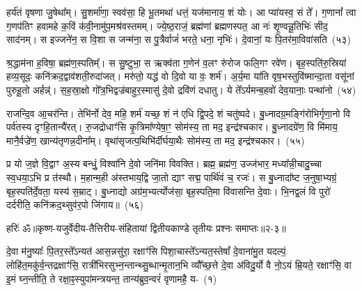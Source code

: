 हर्य॑तं वृषणा जु॒षेथा᳚म्। सु॒शर्मा॑णा॒ स्वव॑सा॒ हि भू॒तमथा॑ धत्तं॒ यज॑मानाय॒ शं योः। आ प्या॑यस्व॒ सं ते᳚। ग॒णानां᳚ त्वा ग॒णप॑तिꣳ हवामहे क॒विं क॑वी॒नामु॑प॒मश्र॑वस्तमम्। ज्ये॒ष्ठ॒राजं॒ ब्रह्म॑णां ब्रह्मणस्पत॒ आ नः॑ शृ॒ण्वन्नू॒तिभिः॑ सीद॒ साद॑नम्। स इज्जने॑न॒ स वि॒शा स जन्म॑ना॒ स पु॒त्रैर्वाजं॑ भरते॒ धना॒ नृभिः॑। दे॒वानां॒ यः पि॒तर॑मा॒विवा॑सति~(५३)

श्र॒द्धाम॑ना ह॒विषा॒ ब्रह्म॑ण॒स्पतिम्᳚। स सु॒ष्टुभा॒ स ऋक्व॑ता ग॒णेन॑ व॒लꣳ रु॑रोज फलि॒गꣳ रवे॑ण। बृह॒स्पति॑रु॒स्रिया॑ हव्य॒सूदः॒ कनि॑क्रद॒द्वाव॑शती॒रुदा॑जत्। मरु॑तो॒ यद्ध॑ वो दि॒वो या वः॒ शर्म॑। अ॒र्य॒मा या॑ति वृष॒भस्तुवि॑ष्मान्दा॒ता वसू॑नां पुरुहू॒तो अर्\mbox{}हन्न्॑। स॒ह॒स्रा॒क्षो गो᳚त्र॒भिद्वज्र॑बाहुर॒स्मासु॑ दे॒वो द्रवि॑णं दधातु। ये ते᳚\-ऽर्यमन्ब॒हवो॑ देव॒यानाः॒ पन्था॑नो~(५४)

राजन्दि॒व आ॒चर॑न्ति। तेभि॑र्नो देव॒ महि॒ शर्म॑ यच्छ॒ शं न॑ एधि द्वि॒पदे॒ शं चतु॑ष्पदे। बु॒ध्नादग्र॒मङ्गि॑रोभिर्गृणा॒नो वि पर्व॑तस्य दृꣳहि॒तान्यै॑रत्। रु॒जद्रोधाꣳ॑सि कृ॒त्रिमा᳚ण्येषा॒ꣳ॒ सोम॑स्य॒ ता मद॒ इन्द्र॑श्चकार। बु॒ध्नादग्रे॑ण॒ वि मि॑माय॒ मानै॒र्वज्रे॑ण॒ खान्य॑तृणन्न॒दीना᳚म्। वृथा॑सृजत्प॒थिभि॑र्दीर्घया॒थैः सोम॑स्य॒ ता मद॒ इन्द्र॑श्चकार।~(५५)

प्र यो ज॒ज्ञे वि॒द्वाꣳ अ॒स्य बन्धुं॒ विश्वा॑नि दे॒वो जनि॑मा विवक्ति। ब्रह्म॒ ब्रह्म॑ण॒ उज्ज॑भार॒ मध्या᳚न्नी॒चादु॒च्चा स्व॒धया॒\-ऽभि प्र त॑स्थौ। म॒हान्म॒ही अ॑स्तभाय॒द्वि जा॒तो द्याꣳ सद्म॒ पार्थि॑वं च॒ रजः॑। स बु॒ध्नादा᳚ष्ट ज॒नुषा॒भ्यग्रं॒ बृह॒स्पति॑र्दे॒वता॒ यस्य॑ स॒म्राट्। बु॒ध्नाद्यो अग्र॑म॒भ्यर्त्योज॑सा॒ बृह॒स्पति॒मा वि॑वासन्ति दे॒वाः। भि॒नद्व॒लं वि पुरो॑ दर्दरीति॒ कनि॑क्रद॒थ्सुव॑र॒पो जि॑गाय॥~(५६)

{\anuvakamend[{यु॒वं वी॒तमा॒ विवा॑सति॒ पन्था॑नो दीर्घया॒थैः सोम॑स्य॒ ता मद॒ इन्द्र॑श्चकार दे॒वा नव॑ च}]}%

{हरिः॑ ॐ}{॥कृष्ण-यजुर्वेदीय-तैत्तिरीय-संहितायां द्वितीयकाण्डे तृतीयः प्रश्नः समाप्तः॥२-३॥}

\setcounter{anuvakam}{0}
दे॒वा म॑नु॒ष्याः᳚ पि॒तर॒स्ते᳚\-ऽन्यत॑ आस॒न्नसु॑रा॒ रक्षाꣳ॑सि पिशा॒चास्ते᳚\-ऽन्यत॒स्तेषां᳚ दे॒वाना॑मु॒त यदल्पं॒ लोहि॑त॒मकु॑र्व॒न्तद्रक्षाꣳ॑सि॒ रात्री॑भिरसुभ्न॒न्तान्थ्सु॒ब्धान्मृ॒तान॒भि व्यौ᳚च्छ॒त्ते दे॒वा अ॑विदु॒र्यो वै नो॒\-ऽयं म्रि॒यते॒ रक्षाꣳ॑सि॒ वा इ॒मं घ्न॒न्तीति॒ ते रक्षा॒ꣴ॒स्युपा॑मन्त्रयन्त॒ तान्य॑ब्रुव॒न्वरं॑ वृणामहै॒ य-~(१)

